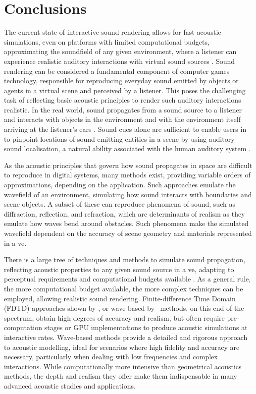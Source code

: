 \section{Conclusions}
The current state of interactive sound rendering allows for fast acoustic simulations, even on platforms with limited computational budgets, approximating the soundfield of any given environment, where a listener can experience realistic auditory interactions with virtual sound sources \citep{lakka2018spatial, hulusic2012acoustic}. Sound rendering can be considered a fundamental component of computer games technology, responsible for reproducing everyday sound emitted by objects or agents in a virtual scene and perceived by a listener. This poses the challenging task of reflecting basic acoustic principles to render such auditory interactions realistic. In the real world, sound propagates from a sound source to a listener and interacts with objects in the environment and with the environment itself arriving at the listener's ears \citep{kuttruff2016room}. Sound cues alone are sufficient to enable users in  to pinpoint locations of sound-emitting entities in a scene by using auditory sound localisation, a natural ability associated with the human auditory system \citep{lokki2005navigation, rubio2017immersive}.\par
As the acoustic principles that govern how sound propagates in space are difficult to reproduce in digital systems, many methods exist, providing variable orders of approximations, depending on the application. Such approaches emulate the wavefield of an environment, simulating how sound interacts with boundaries and scene objects. A subset of these can reproduce phenomena of sound, such as diffraction, reflection, and refraction, which are determinants of realism as they emulate how waves bend around obstacles. Such phenomena make the simulated wavefield dependent on the accuracy of scene geometry and materials represented in a \acrshort{ve}. \par
There is a large tree of techniques and methods to simulate sound propagation, reflecting acoustic properties to any given sound source in a \acrshort{ve}, adapting to perceptual requirements and computational budgets available \cite{doukakis2019audio}. As a general rule, the more computational budget available, the more complex techniques can be employed, allowing realistic sound rendering. Finite-difference Time Domain (FDTD) approaches shown by \cite{hamilton2017fdtd}, or wave-based by~\cite{raghuvanshi2014parametric} methods, on this end of the spectrum, obtain high degrees of accuracy and realism, but often require pre-computation stages or GPU implementations to produce acoustic simulations at interactive rates. Wave-based methods provide a detailed and rigorous approach to acoustic modelling, ideal for scenarios where high fidelity and accuracy are necessary, particularly when dealing with low frequencies and complex interactions. While computationally more intensive than geometrical acoustics methods, the depth and realism they offer make them indispensable in many advanced acoustic studies and applications.\par
